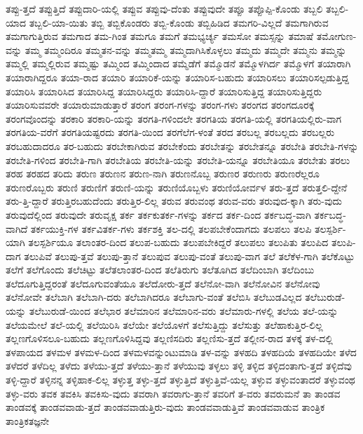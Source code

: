 {ತಪ್ಪು-ತ್ತದೆ
ತಪ್ಪುತ್ತಿದೆ
ತಪ್ಪುದಾರಿ-ಯಲ್ಲಿ
ತಪ್ಪುವ
ತಪ್ಪುವು-ದೆಂತು
ತಪ್ಪುವುದೇ
ತಪ್ಪೂ
ತಪ್ಪೊಪ್ಪಿ-ಕೊಂಡು
ತಬ್ಬಲಿ
ತಬ್ಬಲಿ-ಯಾದ
ತಬ್ಬಲಿ-ಯಾ-ಯಿತು
ತಬ್ಬಿ
ತಬ್ಬಿಕೊಂಡರು
ತಬ್ಬಿ-ಕೊಂಡು
ತಬ್ಬಿಹಿಡಿದ
ತಮಗರಿ-ವಿಲ್ಲದೆ
ತಮಗಾಗಿರುವ
ತಮಗಾಗುತ್ತಿರುವ
ತಮಗಾದ
ತಮ-ಗಿಂತ
ತಮಗೂ
ತಮಗೆ
ತಮಭ್ಯರ್ಚ್ಯ
ತಮಸೋ
ತಮಸ್ಸನ್ನು
ತಮಾಷೆ
ತಮೋಗುಣ-ವನ್ನು
ತಮ್ಮ
ತಮ್ಮಂದಿರೂ
ತಮ್ಮತನ-ವನ್ನು
ತಮ್ಮತಮ್ಮ
ತಮ್ಮದಾಗಿಸಿಕೊಳ್ಳಲು
ತಮ್ಮದು
ತಮ್ಮದೇ
ತಮ್ಮನು
ತಮ್ಮನ್ನು
ತಮ್ಮಲ್ಲಿ
ತಮ್ಮಲ್ಲಿರುವ
ತಮ್ಮಷ್ಟು
ತಮ್ಮಿಂದ
ತಮ್ಮಿಂದಾದ
ತಮ್ಮೆಡೆಗೆ
ತಮ್ಮೊಡನೆ
ತಮ್ಮೊಳಗಿರ್ದ
ತಮ್ಮೊಳಗೆ
ತಯಾರಾಗಿ
ತಯಾರಾಗಿದ್ದರೂ
ತಯಾ-ರಾದ
ತಯಾರಿ
ತಯಾರಿಕೆ-ಯನ್ನು
ತಯಾರಿಸ-ಬಹುದು
ತಯಾರಿಸಲು
ತಯಾರಿಸಲ್ಪಡುತ್ತಿದ್ದ
ತಯಾರಿಸಿ
ತಯಾರಿಸಿದ
ತಯಾರಿಸಿದ್ದ
ತಯಾರಿಸಿದ್ದರು
ತಯಾರಿಸಿ-ದ್ದಾರೆ
ತಯಾರಿಸುತ್ತಿದ್ದ
ತಯಾರಿಸುತ್ತಿದ್ದರು
ತಯಾರಿಸುವವರೇ
ತಯಾರುಮಾಡುತ್ತಾರೆ
ತರಂಗ
ತರಂಗ-ಗಳನ್ನು
ತರಂಗ-ಗಳು
ತರಂಗದ
ತರಂಗದೂರಕ್ಕೆ
ತರಂಗವೊಂದನ್ನು
ತರಕಾರಿ
ತರಕಾರಿ-ಯನ್ನು
ತರಗತಿ-ಗಳಿಂದಲೇ
ತರಗತಿಯ
ತರಗತಿ-ಯಲ್ಲಿ
ತರಗತಿಯಲ್ಲಿರು-ವಾಗ
ತರಗತಿಯ-ವರೆಗೆ
ತರಗತಿಯಷ್ಟರದು
ತರಗತಿ-ಯಿಂದ
ತರಗೆಲೆಗ-ಳಂತೆ
ತರದ
ತರಬಲ್ಲ
ತರಬಲ್ಲದು
ತರಬಲ್ಲರು
ತರಬಹುದಾದರೂ
ತರ-ಬಹುದು
ತರಬೇಕಾಗಿರುವ
ತರಬೇಕೆಂದು
ತರಬೇತನ್ನು
ತರಬೇತನ್ನೂ
ತರಬೇತಿ
ತರಬೇತಿ-ಗಳನ್ನು
ತರಬೇತಿ-ಗಳಿಂದ
ತರಬೇತಿ-ಗಾಗಿ
ತರಬೇತಿಯ
ತರಬೇತಿ-ಯನ್ನು
ತರಬೇತಿ-ಯನ್ನೂ
ತರಬೇತಿಯೂ
ತರಬೇತು
ತರಲು
ತರಹ
ತರಹದ
ತರಿದು
ತರುಣ
ತರುಣನ
ತರುಣ-ನಾಗಿ
ತರುಣನೊಬ್ಬ
ತರುಣರ
ತರುಣರು
ತರುಣರೆಲ್ಲರೂ
ತರುಣರೊಬ್ಬರು
ತರುಣಿ
ತರುಣಿಗೆ
ತರುಣಿ-ಯನ್ನು
ತರುಣಿಯೊಬ್ಬಳು
ತರುಣಿಯೋರ್ವಳ
ತರು-ತ್ತದೆ
ತರುತ್ತಲಿ-ದ್ದೇನೆ
ತರು-ತ್ತಿ-ದ್ದಾರೆ
ತರುತ್ತಿರಬಹುದೆಂದು
ತರುತ್ತಿರ-ಲಿಲ್ಲ
ತರುವ
ತರುವಂಥ
ತರುವ-ವರು
ತರುವುದ-ಕ್ಕಾಗಿ
ತರು-ವುದು
ತರುವುದೆಲ್ಲಿಂದ
ತರುವುದೇ
ತರುವೃಕ್ಷ
ತರ್ಕ
ತರ್ಕಕುತರ್ಕ-ಗಳನ್ನು
ತರ್ಕದ
ತರ್ಕ-ದಿಂದ
ತರ್ಕಬದ್ಧ-ವಾಗಿ
ತರ್ಕಬದ್ಧ-ವಾಗಿದೆ
ತರ್ಕಯುಕ್ತಿ-ಗಳ
ತರ್ಕವಿತರ್ಕ-ಗಳು
ತರ್ಕಶಕ್ತಿ
ತಲ-ದಲ್ಲಿ
ತಲಪಬೇಕೆಂದಾಗದು
ತಲಪಲು
ತಲಪಿ
ತಲಸ್ಪರ್ಶಿ-ಯಾಗಿ
ತಲಸ್ಪರ್ಶಿಯೂ
ತಲಾಂತರ-ದಿಂದ
ತಲುಪ-ಬಹುದು
ತಲುಪಬೇಕಿದ್ದರೆ
ತಲುಪಲು
ತಲುಪಿತು
ತಲುಪಿದ
ತಲುಪಿ-ದಾಗ
ತಲುಪಿವೆ
ತಲುಪು-ತ್ತವೆ
ತಲುಪು-ತ್ತಾನೆ
ತಲುಪುವ
ತಲುಪು-ವಂತೆ
ತಲುಪು-ವಾಗ
ತಲೆ
ತಲೆಕೆಳ-ಗಾಗಿ
ತಲೆಕೊಟ್ಟು
ತಲೆಗೆ
ತಲೆಗೊಂದು
ತಲೆಚಿಟ್ಟು
ತಲೆತಲಾಂತರ-ದಿಂದ
ತಲೆತಿರುಗು
ತಲೆತೂಗಿದ
ತಲೆದಿಂಬಾಗಿ
ತಲೆದಿಂಬು
ತಲೆದೂಗುತ್ತಿದ್ದರಂತೆ
ತಲೆದೂಗುವಂತೆಯೂ
ತಲೆದೋರು-ತ್ತದೆ
ತಲೆನೋ-ವಾಗಿ
ತಲೆನೋವಿನ
ತಲೆನೋವು
ತಲೆನೋವೇ
ತಲೆಬಾಗಿ
ತಲೆಬಾಗಿ-ದರು
ತಲೆಬಾಗಿದರೂ
ತಲೆಬಾಗು-ವಂತೆ
ತಲೆಬಿಸಿ
ತಲೆಬುಡವಿಲ್ಲದ
ತಲೆಬುರುಡೆ-ಯನ್ನು
ತಲೆಬುರುಡೆ-ಯಿಂದ
ತಲೆಭಾರ
ತಲೆಮಾರಿನ
ತಲೆಮಾರಿನ-ವರು
ತಲೆಮಾರು-ಗಳಲ್ಲಿ
ತಲೆಯ
ತಲೆ-ಯನ್ನು
ತಲೆಯಮೇಲೆ
ತಲೆ-ಯಲ್ಲಿ
ತಲೆಯಿರಿಸಿ
ತಲೆಯೇ
ತಲೆಯೊಳಗೆ
ತಲೆಸುತ್ತಿದ್ದು
ತಲೆಸುತ್ತು
ತಲೆಹಾಕುತ್ತಿರ-ಲಿಲ್ಲ
ತಲ್ಲಣಗೊಳಿಸಲೂ-ಬಹುದು
ತಲ್ಲಣಗೊಳಿಸಿದ್ದವು
ತಲ್ಲಣಿಸದಿರು
ತಲ್ಲಣಿಸು-ತ್ತದೆ
ತಲ್ಲೀನ-ರಾದ
ತಳಕ್ಕೆ
ತಳ-ದಲ್ಲಿ
ತಳಪಾಯದ
ತಳಮಳ
ತಳಮಳ-ದಿಂದ
ತಳಮಳವನ್ನುಂಟುಮಾಡಿ
ತಳ-ವನ್ನು
ತಳಹದಿ
ತಳಹದಿಯೆ
ತಳಹದಿಯೇ
ತಳೆದ
ತಳೆದರೆ
ತಳೆದಿಲ್ಲ
ತಳೆದು
ತಳೆಯು-ತ್ತದೆ
ತಳೆಯು-ತ್ತಾನೆ
ತಳೆಯುವು
ತಳ್ಳಲು
ತಳ್ಳಿ
ತಳ್ಳಿದ
ತಳ್ಳಿದಂತಾಗು-ತ್ತದೆ
ತಳ್ಳಿದೆವು
ತಳ್ಳಿ-ದ್ದಾರೆ
ತಳ್ಳಿನನ್ನ
ತಳ್ಳಿಹಾಕ-ಲಿಲ್ಲ
ತಳ್ಳುತ್ತ
ತಳ್ಳು-ತ್ತದೆ
ತಳ್ಳುತ್ತಿದೆ
ತಳ್ಳುತ್ತಿವೆ-ಯಲ್ಲ
ತಳ್ಳುವ
ತಳ್ಳುವಂತಾದರೆ
ತಳ್ಳುವಂಥ
ತಳ್ಳು-ವರು
ತವಕ
ತವಕಿಸಿ
ತವಕಿಸು-ವುದು
ತವರಾಗಿ
ತವರಾಗು-ತ್ತಾನೆ
ತವರಿಗೆ
ತ-ವರು
ತವರುಮನೆ
ತಾ
ತಾಂಡವ
ತಾಂಡವಕ್ಕೆ
ತಾಂಡವವಾಡು-ತ್ತದೆ
ತಾಂಡವವಾಡುತ್ತಿರು-ವುದು
ತಾಂಡವವಾಡುತ್ತಿವೆ
ತಾಂಡವವಾಡುವ
ತಾಂತ್ರಿಕ
ತಾಂತ್ರಿಕತಜ್ಞನೇ
}
